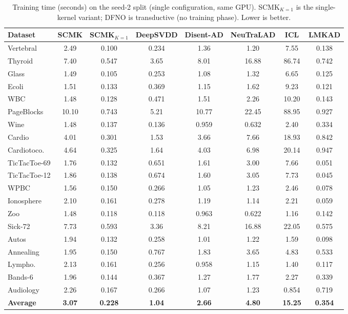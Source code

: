 \begin{table}[t]
\centering
\caption{Training time (seconds) on the seed-2 split (single configuration, same GPU). SCMK$_{K=1}$ is the single-kernel variant; DFNO is transductive (no training phase). Lower is better.}
\label{tab:runtime-train}
\scriptsize
\setlength{\tabcolsep}{4pt}
\begin{tabular}{lccccccc}
\toprule
Dataset & SCMK & SCMK$_{K=1}$ & DeepSVDD & Disent-AD & NeuTraLAD & ICL & LMKAD \\
\midrule
Vertebral    & 2.49 & 0.100 & 0.234 & 1.36 & 1.20 & 7.55 & 0.138 \\
Thyroid      & 7.40 & 0.547 & 3.65 & 8.01 & 16.88 & 86.74 & 0.742 \\
Glass        & 1.49 & 0.105 & 0.253 & 1.08 & 1.32 & 6.65 & 0.125 \\
Ecoli        & 1.51 & 0.133 & 0.369 & 1.15 & 1.62 & 9.23 & 0.121 \\
WBC          & 1.48 & 0.128 & 0.471 & 1.51 & 2.26 & 10.20 & 0.143 \\
PageBlocks   & 10.10 & 0.743 & 5.21 & 10.77 & 22.45 & 88.95 & 0.927 \\
Wine         & 1.48 & 0.137 & 0.136 & 0.959 & 0.632 & 2.40 & 0.334 \\
Cardio       & 4.01 & 0.301 & 1.53 & 3.66 & 7.66 & 18.93 & 0.842 \\
Cardiotoco.  & 4.64 & 0.325 & 1.64 & 4.03 & 6.98 & 20.14 & 0.947 \\
TicTacToe-69 & 1.76 & 0.132 & 0.651 & 1.61 & 3.00 & 7.66 & 0.051 \\
TicTacToe-12 & 1.86 & 0.138 & 0.674 & 1.60 & 3.05 & 7.73 & 0.045 \\
WPBC         & 1.56 & 0.150 & 0.266 & 1.05 & 1.23 & 2.46 & 0.078 \\
Ionosphere   & 2.10 & 0.161 & 0.278 & 1.19 & 1.14 & 2.21 & 0.059 \\
Zoo          & 1.48 & 0.118 & 0.118 & 0.963 & 0.622 & 1.16 & 0.142 \\
Sick-72      & 7.73 & 0.593 & 3.36 & 8.21 & 16.88 & 22.05 & 0.575 \\
Autos        & 1.94 & 0.132 & 0.258 & 1.01 & 1.22 & 1.59 & 0.098 \\
Annealing    & 1.95 & 0.150 & 0.767 & 1.83 & 3.65 & 4.83 & 0.533 \\
Lympho.      & 2.13 & 0.161 & 0.256 & 0.958 & 1.15 & 1.40 & 0.117 \\
Bands-6      & 1.96 & 0.144 & 0.367 & 1.27 & 1.77 & 2.27 & 0.339 \\
Audiology    & 2.26 & 0.167 & 0.266 & 1.07 & 1.23 & 0.854 & 0.719 \\
\midrule
\textbf{Average} & \textbf{3.07} & \textbf{0.228} & \textbf{1.04} & \textbf{2.66} & \textbf{4.80} & \textbf{15.25} & \textbf{0.354} \\
\bottomrule
\end{tabular}
\end{table}